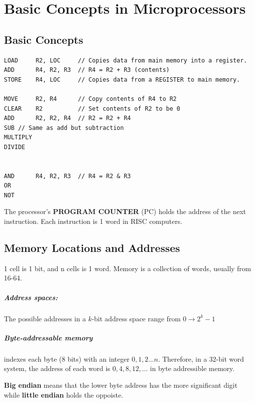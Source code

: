 \documentclass[a4paper,12pt]{report}
\begin{document}
\chapter{Basic Concepts in Microprocessors}
\section{Basic Concepts}

\begin{lstlisting}
LOAD     R2, LOC     // Copies data from main memory into a register. 
ADD      R4, R2, R3  // R4 = R2 + R3 (contents)
STORE    R4, LOC     // Copies data from a REGISTER to main memory.

MOVE     R2, R4      // Copy contents of R4 to R2
CLEAR    R2          // Set contents of R2 to be 0
ADD      R2, R2, R4  // R2 = R2 + R4
SUB // Same as add but subtraction
MULTIPLY
DIVIDE


AND      R4, R2, R3  // R4 = R2 & R3
OR
NOT
\end{lstlisting}

The processor's \textbf{PROGRAM COUNTER} (PC) holds the address of the next instruction. Each instruction is 1 word in RISC computers.

\section{Memory Locations and Addresses}
1 cell is 1 bit, and n cells is 1 word. Memory is a collection of words, usually from 16-64.
\paragraph{Address spaces: } The possible addresses in a $k$-bit address space range from $0\to 2^{k}-1$
\paragraph{Byte-addressable memory } indexes each byte (8 bits) with an integer $0, 1, 2... n$. Therefore, in a 32-bit word system, 
the address of each word is $0, 4, 8, 12, ...$ in byte addressible memory.

\textbf{Big endian} means that the lower byte address has the more significant digit while \textbf{little endian} holds the oppoiste.
\end{document}

